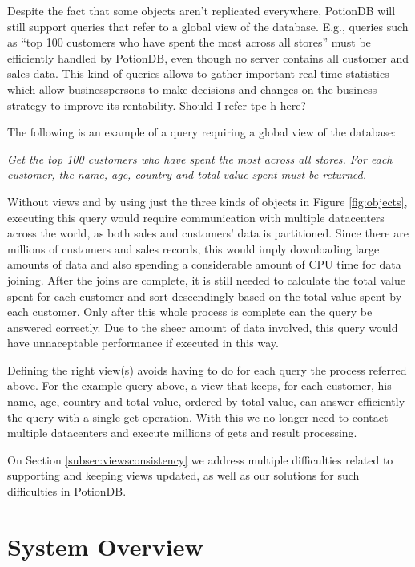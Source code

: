 \documentclass{vldb}
\newcommand{\grumbler}[2]{{\color{red}{\bf #1:} #2}}
\newcommand{\andre}[1]{\grumbler{andre}{#1}}
\newcommand{\emphvspace}{0.5\baselineskip}
\newcommand{\lineemph}[1]{\vspace{\emphvspace}\hspace{2em}\emph{#1}\vspace{\emphvspace}}
\begin{document}
Despite the fact that some objects aren't replicated everywhere, PotionDB will still support queries that refer to a global view of the database.
E.g., queries such as ``top 100 customers who have spent the most across all stores'' must be efficiently handled by PotionDB, even though no server contains all customer and sales data. 
This kind of queries allows to gather important real-time statistics which allow businesspersons to make decisions and changes on the business strategy to improve its rentability.
\andre{Should I refer tpc-h here?}

The following is an example of a query requiring a global view of the database:

\lineemph{Get the top 100 customers who have spent the most across all stores. For each customer, the name, age, country and total value spent must be returned.}

Without views and by using just the three kinds of objects in Figure \ref{fig:objects}, executing this query would require communication with multiple datacenters across the world, as both sales and customers' data is partitioned.
Since there are millions of customers and sales records, this would imply downloading large amounts of data and also spending a considerable amount of CPU time for data joining.
After the joins are complete, it is still needed to calculate the total value spent for each customer and sort descendingly based on the total value spent by each customer.
Only after this whole process is complete can the query be answered correctly.
Due to the sheer amount of data involved, this query would have unnaceptable performance if executed in this way.

Defining the right view(s) avoids having to do for each query the process referred above.
For the example query above, a view that keeps, for each customer, his name, age, country and total value, ordered by total value, can answer efficiently the query with a single get operation.
With this we no longer need to contact multiple datacenters and execute millions of gets and result processing.

On Section \ref{subsec:viewsconsistency} we address multiple difficulties related to supporting and keeping views updated, as well as our solutions for such difficulties in PotionDB.

\section{System Overview}
\end{document}
